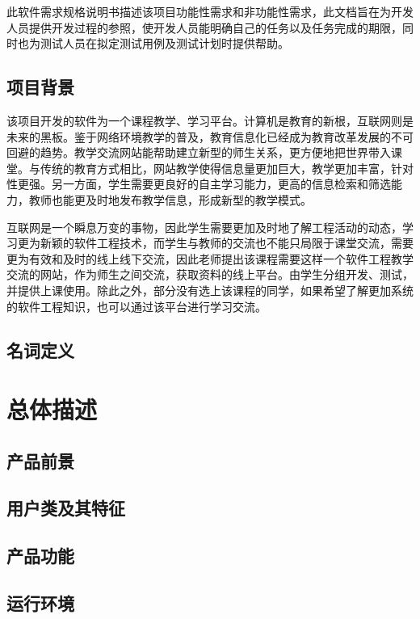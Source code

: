 \documentclass[12pt]{ctexart} %
\begin{document}
此软件需求规格说明书描述该项目功能性需求和非功能性需求，此文档旨在为开发人员提供开发过程的参照，使开发人员能明确自己的任务以及任务完成的期限，同时也为测试人员在拟定测试用例及测试计划时提供帮助。

\subsection{项目背景}
该项目开发的软件为一个课程教学、学习平台。计算机是教育的新根，互联网则是未来的黑板。鉴于网络环境教学的普及，教育信息化已经成为教育改革发展的不可回避的趋势。教学交流网站能帮助建立新型的师生关系，更方便地把世界带入课堂。与传统的教育方式相比，网站教学使得信息量更加巨大，教学更加丰富，针对性更强。另一方面，学生需要更良好的自主学习能力，更高的信息检索和筛选能力，教师也能更及时地发布教学信息，形成新型的教学模式。

互联网是一个瞬息万变的事物，因此学生需要更加及时地了解工程活动的动态，学习更为新颖的软件工程技术，而学生与教师的交流也不能只局限于课堂交流，需要更为有效和及时的线上线下交流，因此老师提出该课程需要这样一个软件工程教学交流的网站，作为师生之间交流，获取资料的线上平台。由学生分组开发、测试，并提供上课使用。除此之外，部分没有选上该课程的同学，如果希望了解更加系统的软件工程知识，也可以通过该平台进行学习交流。

\subsection{名词定义}

\section{总体描述}
\subsection{产品前景}

\subsection{用户类及其特征}

\subsection{产品功能}

\subsection{运行环境}
\end{document}
